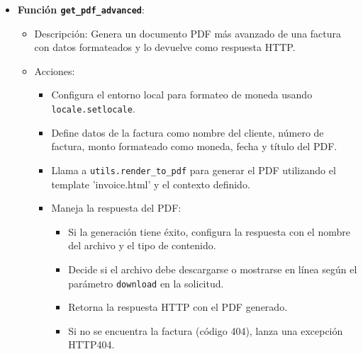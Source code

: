 \documentclass{article}
\begin{document}
\begin{itemize}
        \item \textbf{Función \texttt{get\_pdf\_advanced}}:
            \begin{itemize}
                \item Descripción: Genera un documento PDF más avanzado de una factura con datos formateados y lo devuelve como respuesta HTTP.
                \item Acciones:
                    \begin{itemize}
                        \item Configura el entorno local para formateo de moneda usando \texttt{locale.setlocale}.
                        \item Define datos de la factura como nombre del cliente, número de factura, monto formateado como moneda, fecha y título del PDF.
                        \item Llama a \texttt{utils.render\_to\_pdf} para generar el PDF utilizando el template 'invoice.html' y el contexto definido.
                        \item Maneja la respuesta del PDF:
                            \begin{itemize}
                                \item Si la generación tiene éxito, configura la respuesta con el nombre del archivo y el tipo de contenido.
                                \item Decide si el archivo debe descargarse o mostrarse en línea según el parámetro \texttt{download} en la solicitud.
                                \item Retorna la respuesta HTTP con el PDF generado.
                                \item Si no se encuentra la factura (código 404), lanza una excepción HTTP404.
                            \end{itemize}
                    \end{itemize}
            \end{itemize}
            

\end{itemize}
\end{document}
